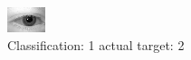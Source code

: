 \begin{figure}[h!]
\begin{center}
\includegraphics[width=0.60\columnwidth]{figures/ID384_class_1_target_2.png}
\end{center}
\caption{ Classification: 1 actual target: 2}
\label{fig:ID384_class_1_target_2}
\end{figure}
